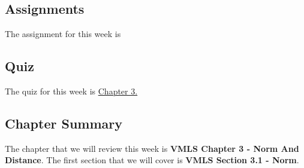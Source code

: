 \subsection{Assignments}

The assignment for this week is   

\subsection{Quiz}

The quiz for this week is \href{https://applied.cs.colorado.edu/mod/quiz/view.php?id=50699}{Chapter 3.}  

\subsection{Chapter Summary}

The chapter that we will review this week is \textbf{VMLS Chapter 3 - Norm And Distance}. The first section that we will cover is \textbf{VMLS Section 3.1 - Norm}.

